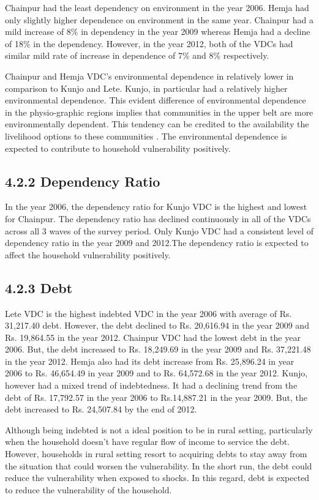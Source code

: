 Chainpur had the least dependency on environment in the year 2006. Hemja had only slightly higher dependence on environment in the same year. Chainpur had a mild increase of 8\% in dependency in the year 2009 whereas Hemja had a decline of 18\% in the dependency. However, in the year 2012, both of the VDCs had similar mild rate of increase in dependence of 7\% and 8\% respectively.

Chainpur and Hemja VDC's environmental dependence in relatively lower in comparison to Kunjo and Lete. Kunjo, in particular had a relatively higher environmental dependence. This evident difference of environmental dependence in the physio-graphic regions implies that communities in the upper belt are more environmentally dependent. This tendency can be credited to the availability the livelihood options to these communities \citep{rayamajhi2012empirical, larsen2014role}. The environmental dependence is expected to contribute to household vulnerability positively.           
\subsection*{4.2.2 Dependency Ratio}
In the year 2006, the dependency ratio for Kunjo VDC is the highest and lowest for Chainpur. The dependency ratio has declined continuously in all of the VDCs across all 3 waves of the survey period. Only Kunjo VDC had a consistent level of dependency ratio in the year 2009 and 2012.The dependency ratio is expected to affect the household vulnerability positively. 

\subsection*{4.2.3 Debt}
Lete VDC is the highest indebted VDC in the year 2006 with average of Rs. 31,217.40 debt. However, the debt declined to Rs. 20,616.94 in the year 2009 and Rs. 19,864.55 in the year 2012. Chainpur VDC had the lowest debt in the year 2006. But, the debt increased to Rs. 18,249.69 in the year 2009 and Rs. 37,221.48 in the year 2012. Hemja also had its debt increase from Rs. 25,896.24 in year 2006 to Rs. 46,654.49 in year 2009 and to Rs. 64,572.68 in the year 2012. Kunjo, however had a mixed trend of indebtedness. It had a declining trend from the debt of Rs. 17,792.57 in the year 2006 to Rs.14,887.21 in the year 2009. But, the debt increased to Rs. 24,507.84 by the end of 2012.

Although being indebted is not a ideal position to be in rural setting, particularly when the household doesn't have regular flow of income to service the debt. However, households in rural setting resort to acquiring debts to stay away from the situation that could worsen the vulnerability. In the short run, the debt could reduce the vulnerability when exposed to shocks. In this regard, debt is expected to reduce the vulnerability of the household.   

